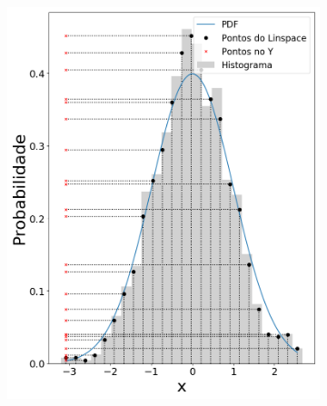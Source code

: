 \begin{figure}[H]
	\centering
	\begin{subfigure}[b]{0.3\textwidth}
		\centering 
		\includegraphics[width=\linewidth]{./figuras/normal_1_0}
		\caption{}
		\label{fig:randnlin}
	\end{subfigure}
	\hfill
	\begin{subfigure}[b]{0.3\textwidth}
		\centering 

\end{subfigure}
\end{figure}
